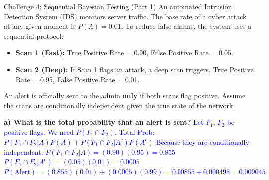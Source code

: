\documentclass[aspectratio=169]{beamer}
\begin{document}
\begin{frame}{Challenge 4: Sequential Bayesian Testing (Part 1)}
    \small
    An automated Intrusion Detection System (IDS) monitors server traffic. The base rate of a cyber attack at any given moment is $P(A) = 0.01$. To reduce false alarms, the system uses a sequential protocol:
    \begin{itemize}
        \item \textbf{Scan 1 (Fast):} True Positive Rate = 0.90, False Positive Rate = 0.05.
        \item \textbf{Scan 2 (Deep):} If Scan 1 flags an attack, a deep scan triggers. True Positive Rate = 0.95, False Positive Rate = 0.01.
    \end{itemize}
    An alert is officially sent to the admin \textbf{only} if both scans flag positive. Assume the scans are conditionally independent given the true state of the network.
    
    \vspace{0.2cm}
    \textbf{a) What is the total probability that an alert is sent?} \pause
    \newline \textcolor{blue}{Let $F_1$, $F_2$ be positive flags. We need $P(F_1 \cap F_2)$. Total Prob: $P(F_1 \cap F_2 | A)P(A) + P(F_1 \cap F_2 | A^c)P(A^c)$}
    \newline \textcolor{blue}{Because they are conditionally independent: }
    \newline \textcolor{blue}{$P(F_1 \cap F_2 | A) = (0.90)(0.95) = 0.855$}
    \newline \textcolor{blue}{$P(F_1 \cap F_2 | A^c) = (0.05)(0.01) = 0.0005$} \pause
    \newline \textcolor{blue}{$P(\text{Alert}) = (0.855)(0.01) + (0.0005)(0.99) = 0.00855 + 0.000495 = 0.009045$}
\end{frame}
\end{document}
